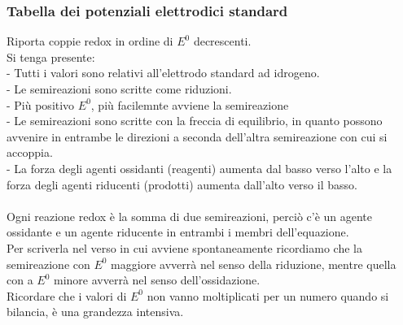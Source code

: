 \subsubsection{Tabella dei potenziali elettrodici standard}
Riporta coppie redox in ordine di $E^0$ decrescenti.\\
Si tenga presente:\\
\tab- Tutti i valori sono relativi all'elettrodo standard ad idrogeno.\\
\tab- Le semireazioni sono scritte come riduzioni.\\
\tab- Più positivo $E^0$, più facilemnte avviene la semireazione\\
\tab- Le semireazioni sono scritte con la freccia di equilibrio, in quanto possono avvenire in entrambe le direzioni a seconda dell'altra semireazione con cui si accoppia.\\
\tab- La forza degli agenti ossidanti (reagenti) aumenta dal basso verso l'alto e la forza degli agenti riducenti (prodotti) aumenta dall'alto verso il basso.\\\\
Ogni reazione redox è la somma di due semireazioni, perciò c'è un agente ossidante e un agente riducente in entrambi i membri dell'equazione.\\
Per scriverla nel verso in cui avviene spontaneamente ricordiamo che la semireazione con $E^0$ maggiore avverrà nel senso della riduzione, mentre quella con a $E^0$ minore avverrà nel senso dell'ossidazione.\\
Ricordare che i valori di $E^0$ non vanno moltiplicati per un numero quando si bilancia, è una grandezza intensiva.\\
